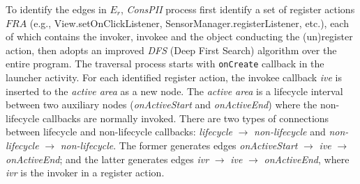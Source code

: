 To identify the edges in $E_r$, \textit{ConsPII} process first identify a set of register actions $\mathit{FRA}$ (e.g., View.setOnClickListener, SensorManager.registerListener, etc.), each of which contains the invoker, invokee and the object conducting the (un)register action, then adopts an improved \textit{DFS} (Deep First Search) algorithm over the entire program. The traversal process starts with \texttt{onCreate} callback in the launcher activity. For each identified register action, the invokee callback \textit{ive} is inserted to the \textit{active area} as a new node. 
The \textit{active area} is a lifecycle interval between two auxiliary nodes (\textit{onActiveStart} and \textit{onActiveEnd}) where the non-lifecycle callbacks are normally invoked.
There are two types of connections between lifecycle and non-lifecycle callbacks: \textit{lifecycle} $\rightarrow $ \textit{non-lifecycle} and \textit{non-lifecycle} $\rightarrow $ \textit{non-lifecycle}. The former generates edges \textit{onActiveStart} $\rightarrow $ \textit{ive} $\rightarrow $ \textit{onActiveEnd}; and the latter generates edges \textit{ivr} $\rightarrow $ \textit{ive} $\rightarrow $ \textit{onActiveEnd}, where \textit{ivr} is the invoker in a register action. %


